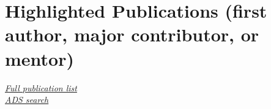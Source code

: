\documentclass[12pt, letterpaper]{apw-cv}
\begin{document}


\section*{Highlighted Publications (first author, major contributor, or mentor)}
\vspace{-1em}

\href{https://adrian.pw/cv/PriceWhelan-pubs.pdf}{{\it Full publication list} \faLink}\\
\href{\adsurl}{{\it ADS search} \faLink}



    \begin{itemize}
        
    \end{itemize}


%         

%         
\end{document}
